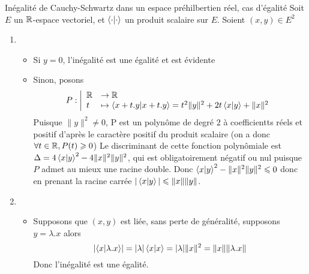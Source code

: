 \documentclass{article}
\renewenvironment{question_kholle}[2][ ]
{
	\subsection{\texorpdfstring{#2}{}}
	\notblank{#1}
	{
		\noindent #1
		\bigbreak
	}
	{}
	\begin{proof}
}
{
	\end{proof}
}
\begin{document}
\begin{question_kholle}{Inégalité de Cauchy-Schwartz dans un espace préhilbertien réel, cas d'égalité}
  Soit $E$ un $\mathbb R$-espace vectoriel, et $\braket{ \cdot | \cdot  }$ un produit scalaire sur $E$.
  Soient $(x, y) \in E^{2}$
  \begin{enumerate}
    \item \begin{itemize}[label=$\star$]
            \item Si $y=0$, l'inégalité est une égalité et est évidente
            \item Sinon, posons
                  $$
                    P:\left|\begin{array}{ll} \mathbb R &\to \mathbb R \\ t &\mapsto \braket{ x+t.y | x+t.y } = t^{2} \|y\|^{2} + 2 t \braket{ x | y }  + \|x\|^{2} \end{array}\right.
                  $$
                  Puisque $\|y\|^{2} \neq 0$, P est un polynôme de degré $2$ à coefficientts réels et positif d'après le caractère positif du produit scalaire (on a donc $\forall t \in \mathbb R, P(t)\geqslant 0$)
                  Le discriminant de cette fonction polynômiale est $\Delta = 4 \braket{ x | y }^{2} - 4 \|x\|^{2}\|y\|^{2}$, qui est obligatoirement négatif ou nul puisque $P$ admet au mieux une racine double.
                  Donc $\braket{ x | y }^{2} - \|x\|^{2}\|y\|^{2} \leqslant 0$ donc en prenant la racine carrée $|\braket{ x | y }| \leqslant \|x\|\|y\|$.
          \end{itemize}
    \item \begin{itemize}[label=$\star$]
            \item Supposons que $(x, y)$ est liée, sans perte de généralité, supposons $y = \lambda.x$ alors
                  $$
                    \lvert \braket{ x | \lambda.x } \rvert  = \lvert  \lambda \rvert  \braket{ x | x }  = \lvert  \lambda \rvert  \|x\|^{2} = \| x \| \| \lambda.x\|
                  $$
                  Donc l'inégalité est une égalité.


\end{itemize}
\end{enumerate}
\end{question_kholle}
\end{document}
